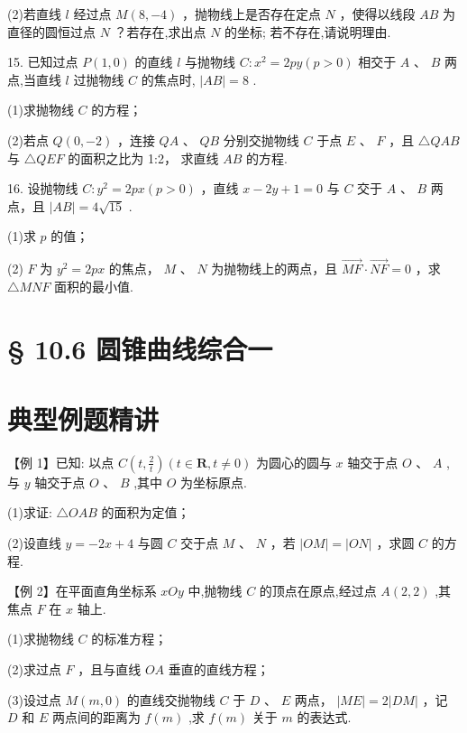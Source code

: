 (2)若直线 $l$ 经过点 $M\left( {8, - 4}\right)$ ，抛物线上是否存在定点 $N$ ，使得以线段 ${AB}$ 为直径的圆恒过点 $N$ ？若存在,求出点 $N$ 的坐标; 若不存在,请说明理由.

15. 已知过点 $P\left( {1,0}\right)$ 的直线 $l$ 与抛物线 $C : {x}^{2} = {2py}\left( {p > 0}\right)$ 相交于 $A$ 、 $B$ 两点,当直线 $l$ 过抛物线 $C$ 的焦点时, $\left| {AB}\right|  = 8$ .

(1)求抛物线 $C$ 的方程；

(2)若点 $Q\left( {0, - 2}\right)$ ，连接 ${QA}\text{ 、 }{QB}$ 分别交抛物线 $C$ 于点 $E\text{ 、 }F$ ，且 $\bigtriangleup  {QAB}$ 与 $\bigtriangleup  {QEF}$ 的面积之比为 1:2， 求直线 ${AB}$ 的方程.

16. 设抛物线 $C : {y}^{2} = {2px}\left( {p > 0}\right)$ ，直线 $x - {2y} + 1 = 0$ 与 $C$ 交于 $A$ 、 $B$ 两点，且 $\left| {AB}\right|  = 4\sqrt{15}$ .

(1)求 $p$ 的值；

(2) $F$ 为 ${y}^{2} = {2px}$ 的焦点， $M$ 、 $N$ 为抛物线上的两点，且 $\overrightarrow{MF} \cdot  \overrightarrow{NF} = 0$ ，求 $\bigtriangleup  {MNF}$ 面积的最小值.

\section*{§ 10.6 圆锥曲线综合一}

\section*{典型例题精讲}

【例 1】已知: 以点 $C\left( {t,\frac{2}{t}}\right) \left( {t \in  \mathbf{R},t \neq  0}\right)$ 为圆心的圆与 $x$ 轴交于点 $O\text{ 、 }A$ ,与 $y$ 轴交于点 $O\text{ 、 }B$ ,其中 $O$ 为坐标原点.

(1)求证: $\bigtriangleup  {OAB}$ 的面积为定值；

(2)设直线 $y =  - {2x} + 4$ 与圆 $C$ 交于点 $M$ 、 $N$ ，若 $\left| {OM}\right|  = \left| {ON}\right|$ ，求圆 $C$ 的方程.

【例 2】在平面直角坐标系 ${xOy}$ 中,抛物线 $C$ 的顶点在原点,经过点 $A\left( {2,2}\right)$ ,其焦点 $F$ 在 $x$ 轴上.

(1)求抛物线 $C$ 的标准方程；

(2)求过点 $F$ ，且与直线 ${OA}$ 垂直的直线方程；

(3)设过点 $M\left( {m,0}\right)$ 的直线交抛物线 $C$ 于 $D$ 、 $E$ 两点， $\left| {ME}\right|  = 2\left| {DM}\right|$ ，记 $D$ 和 $E$ 两点间的距离为 $f\left( m\right)$ ,求 $f\left( m\right)$ 关于 $m$ 的表达式.

